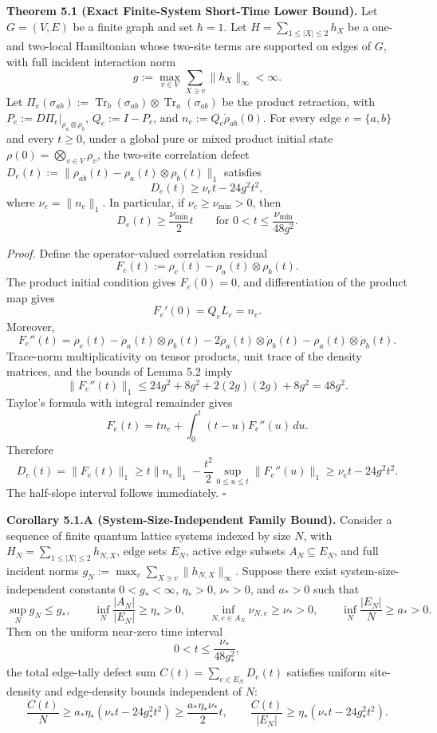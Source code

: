 \documentclass[
  11pt,
]{article}
\begin{document}
\textbf{Theorem 5.1 (Exact Finite-System Short-Time Lower Bound).} Let \(G=(V,E)\) be a finite graph and set \(\hbar = 1\). Let \(H=\sum_{1\le |X|\le2}h_X\) be a one- and two-local Hamiltonian whose two-site terms are supported on edges of \(G\), with full incident interaction norm
\[
g:=\max_{v\in V}\sum_{X\ni v}\lVert h_X\rVert_\infty<\infty.
\]
Let \(\Pi_e(\sigma_{ab}) := \operatorname{Tr}_b(\sigma_{ab}) \otimes \operatorname{Tr}_a(\sigma_{ab})\) be the product retraction, with \(P_e := D\Pi_e|_{\rho_a\otimes\rho_b}\), \(Q_e:=I-P_e\), and \(n_e:=Q_e\dot\rho_{ab}(0)\). For every edge \(e=\{a,b\}\) and every \(t\ge0\), under a global pure or mixed product initial state \(\rho(0)=\bigotimes_{v\in V}\rho_v\), the two-site correlation defect \(D_e(t) := \lVert \rho_{ab}(t) - \rho_a(t) \otimes \rho_b(t)\rVert_1\) satisfies
\[
\boxed{
D_e(t)\ge\nu_e t-24g^2t^2,
}
\]
where \(\nu_e = \lVert n_e\rVert_1\). In particular, if \(\nu_e\ge\nu_{\min}>0\), then
\[
D_e(t)\ge\frac{\nu_{\min}}{2}t
\qquad
\text{for }
0<t\le\frac{\nu_{\min}}{48g^2}.
\]

\emph{Proof.} Define the operator-valued correlation residual
\[
F_e(t):=\rho_e(t)-\rho_a(t)\otimes\rho_b(t).
\]
The product initial condition gives \(F_e(0)=0\), and differentiation of the product map gives
\[
F_e'(0)=Q_eL_e=n_e.
\]
Moreover,
\[
F_e''(t)
=
\ddot\rho_e(t)
-
\ddot\rho_a(t)\otimes\rho_b(t)
-
2\dot\rho_a(t)\otimes\dot\rho_b(t)
-
\rho_a(t)\otimes\ddot\rho_b(t).
\]
Trace-norm multiplicativity on tensor products, unit trace of the density matrices, and the bounds of Lemma 5.2 imply
\[
\lVert F_e''(t)\rVert_1
\le
24g^2+8g^2+2(2g)(2g)+8g^2
=
48g^2.
\]
Taylor's formula with integral remainder gives
\[
F_e(t)
=
tn_e+\int_0^t(t-u)F_e''(u)\,du.
\]
Therefore
\[
D_e(t)=\lVert F_e(t)\rVert_1
\ge
t\lVert n_e\rVert_1
-
\frac{t^2}{2}\sup_{0\le u\le t}\lVert F_e''(u)\rVert_1
\ge
\nu_e t-24g^2t^2.
\]
The half-slope interval follows immediately. \(\square\)

\textbf{Corollary 5.1.A (System-Size-Independent Family Bound).} Consider a sequence of finite quantum lattice systems indexed by size \(N\), with \(H_N=\sum_{1\le |X|\le2}h_{N,X}\), edge sets \(E_N\), active edge subsets \(A_N \subseteq E_N\), and full incident norms \(g_N:=\max_{v}\sum_{X\ni v}\lVert h_{N,X}\rVert_\infty\). Suppose there exist system-size-independent constants \(0<g_*<\infty\), \(\eta_* > 0\), \(\nu_* > 0\), and \(a_* > 0\) such that
\[
\sup_N g_N \le g_*, \qquad \inf_N \frac{|A_N|}{|E_N|} \ge \eta_* > 0, \qquad \inf_{N, e \in A_N} \nu_{N,e} \ge \nu_* > 0, \qquad \inf_N \frac{|E_N|}{N} \ge a_* > 0.
\]
Then on the uniform near-zero time interval
\[
0 < t \le \frac{\nu_*}{48 g_*^2},
\]
the total edge-tally defect sum \(C(t) = \sum_{e \in E_N} D_e(t)\) satisfies uniform site-density and edge-density bounds independent of \(N\):
\[
\frac{C(t)}{N} \ge a_* \eta_* (\nu_* t - 24 g_*^2 t^2) \ge \frac{a_* \eta_* \nu_*}{2} t, \qquad \frac{C(t)}{|E_N|} \ge \eta_* (\nu_* t - 24 g_*^2 t^2).
\]
\end{document}

